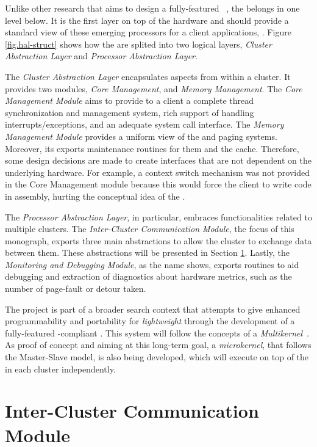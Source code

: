 	Unlike other research that aims to design a fully-featured \os~\cite{Baumann2009,kluge2014,nightingale2009,rhoden2011},
	the \hal belongs in one level below.
	It is the first layer on top of the hardware and should provide a standard
	view of these emerging processors for a client applications, \eg \os.
	Figure \ref{fig.hal-struct} shows how the \hal are splited into two logical layers,
	\textit{Cluster Abstraction Layer} and \textit{Processor Abstraction Layer}.

	The \textit{Cluster Abstraction Layer} encapsulates aspects from within a cluster.
	It provides two modules, \textit{Core Management}, and \textit{Memory Management}.
	The \textit{Core Management Module} aims to provide to a client \os a complete
	thread synchronization and management system, rich support of handling
	interrupts/exceptions, and an adequate system call interface.
	The \textit{Memory Management Module} provides a uniform view of the \tlbs
	and paging systems.
	Moreover, its exports maintenance routines for them and the cache.
	Therefore, some design decisions are made to create interfaces that are not
	dependent on the underlying hardware.
	For example, a context switch mechanism was not provided in the
	Core Management module because this would force the client \os
	to write code in assembly, hurting the conceptual idea of the \hal.

	The \textit{Processor Abstraction Layer}, in particular, embraces
	functionalities related to multiple clusters.
	The \textit{Inter-Cluster Communication Module}, the focus of
	this monograph, exports three main abstractions to allow the
	cluster to exchange data between them.
	These abstractions will be presented in Section \ref{sec.inter-cluster-communication}.
	Lastly, the \textit{Monitoring and Debugging Module}, as the
	name shows, exports routines to aid debugging and extraction
	of diagnostics about hardware metrics, such as the number of
	page-fault or detour taken.

	The \hal project is part of a broader search context that
	attempts to give enhanced programmability and portability
	for \textit{lightweight \manycores} through the development
	of a fully-featured \posix-compliant \os.
	This system will follow the concepts of a \textit{Multikernel}~\cite{Baumann2009}.
	As proof of concept and aiming at this long-term goal,
	a \textit{microkernel}, that follows the Master-Slave model,
	is also being developed, which will execute on top of the \hal
	in each cluster independently.

\section{Inter-Cluster Communication Module}
\label{sec.inter-cluster-communication}

